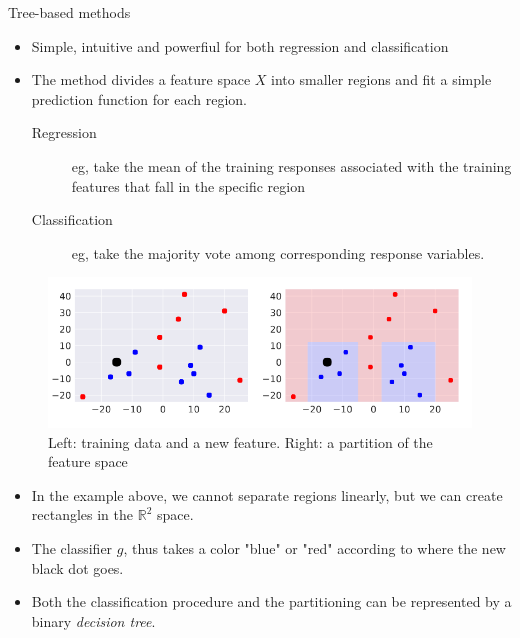 \documentclass{beamer}
\begin{document}
\begin{frame}{Tree-based methods}
\begin{itemize}
    \item Simple, intuitive and powerfiul for both regression and classification
    \item The method divides a feature space $X$ into smaller regions and fit a simple prediction function for each region.
    \begin{description}
        \item[Regression] eg, take the mean of the training responses associated with the training features that fall in the specific region
        \item[Classification] eg, take the majority vote among corresponding response variables.
    \end{description}
\end{itemize}
\end{frame}

\begin{frame}
    \begin{figure}
        \includegraphics[width=0.9\linewidth]{F81Kroese}
        \caption{Left: training data and a new feature. Right: a partition of the feature space\cite{kroese2020}}
        \label{Fig:F81Kroese}
    \end{figure}
\end{frame}

\begin{frame}
    \begin{itemize}
        \item In the example above, we cannot separate regions linearly, but we can create rectangles in the $\mathbb{R}^2$ space.
        \item The classifier $g$, thus takes a color "blue" or "red" according to where the new black dot goes.
        \item Both the classification procedure and the partitioning can be represented by a binary {\em decision tree}.
    \end{itemize}
    \end{frame}
\end{document}
